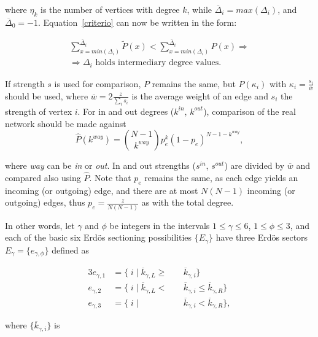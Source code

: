 \documentclass[%
	aip,
	jmp,%
	amsmath,amssymb,
	reprint,%
]{revtex4-1}
\begin{document}
\noindent where $\eta_k$ is the number of vertices with degree $k$, while $\overline{\Delta}_{i}=max(\Delta_{i})$, and $\overline{\Delta}_{0}=-1$. Equation~\ref{criterio} can now be written in the form:

\begin{equation}\label{criterio2}
	\begin{split}
		\sum_{x=min(\Delta_i)}^{\overline{\Delta}_i} \widetilde{P}(x) < \sum_{x=min(\Delta_i)}^{\overline{\Delta}_i} P(x) \Rightarrow \\
	\Rightarrow \Delta_i \text{ holds intermediary degree values.}
	\end{split}
\end{equation}

If strength $s$ is used for comparison, $P$ remains the same, but $P(\kappa_i)$ with $\kappa_i=\frac{s_i}{\overline{w}}$ should be used, where $\overline{w}=2\frac{z}{\sum_is_i}$ is the average weight of an edge and $s_i$ the strength of vertex $i$. For in and out degrees ($k^{in}$, $k^{out}$), comparison of the real network should be made against
\begin{equation}
	\hat{P}(k^{way})=\binom{N-1}{k^{way}}p_e^k(1-p_e)^{N-1-k^{way}},
\end{equation}

\noindent where \emph{way} can be \emph{in} or \emph{out}. In and out strengths ($s^{in}$, $s^{out}$) are divided by $\overline{w}$ and compared also using $\hat{P}$. Note that $p_e$ remains the same, as each edge yields an incoming (or outgoing) edge, and there are at most $N(N-1)$ incoming (or outgoing) edges, thus $p_e=\frac{z}{N(N-1)}$ as with the total degree.

In other words, let $\gamma$ and $\phi$ be integers in the intervals $1 \leq \gamma \leq 6$, $1 \leq \phi \leq 3$, and each of the basic six Erd\"os sectioning possibilities $\{E_{\gamma}\}$ have three Erd\"os sectors $E_{\gamma}= \{e_{\gamma, \phi} \}$ defined as

\begin{alignat}{3}\label{eq:part}
	e_{\gamma,1}&=\{\;i\;|\;\overline{k}_{\gamma,L}\geq&&\overline{k}_{\gamma,i}\} \nonumber \\
	e_{\gamma,2}&=\{\;i\;|\;\overline{k}_{\gamma,L}<\;&&\overline{k}_{\gamma,i}\leq\overline{k}_{\gamma,R}\} \\ 
	e_{\gamma,3}&=\{\;i\;|\;&&\overline{k}_{\gamma,i}<\overline{k}_{\gamma,R}\} \nonumber,
\end{alignat}

\noindent where $\{\overline{k}_{\gamma,i}\}$ is
\end{document}
